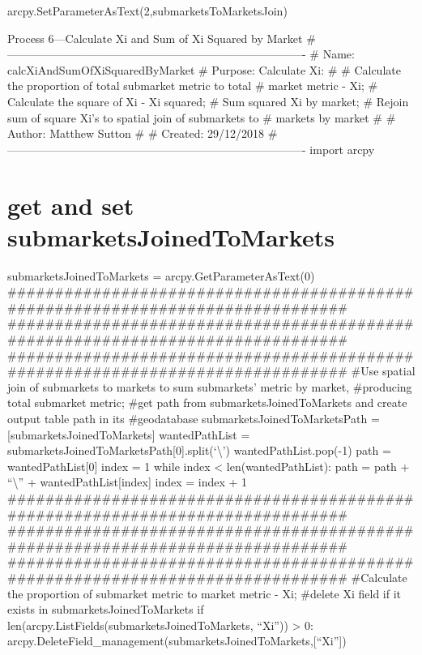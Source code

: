 \documentclass[]{article}
\begin{document}
arcpy.SetParameterAsText(2,submarketsToMarketsJoin)

Process 6---Calculate Xi and Sum of Xi Squared by Market
\#-------------------------------------------------------------------------------
\# Name: calcXiAndSumOfXiSquaredByMarket \# Purpose: Calculate Xi: \# \#
Calculate the proportion of total submarket metric to total \# market
metric - Xi; \# Calculate the square of Xi - Xi squared; \# Sum squared
Xi by market; \# Rejoin sum of square Xi's to spatial join of submarkets
to \# markets by market \# \# Author: Matthew Sutton \# \# Created:
29/12/2018
\#-------------------------------------------------------------------------------
import arcpy

\section{get and set
submarketsJoinedToMarkets}\label{get-and-set-submarketsjoinedtomarkets}

submarketsJoinedToMarkets = arcpy.GetParameterAsText(0)
\#\#\#\#\#\#\#\#\#\#\#\#\#\#\#\#\#\#\#\#\#\#\#\#\#\#\#\#\#\#\#\#\#\#\#\#\#\#\#\#\#\#\#\#\#\#\#\#\#\#\#\#\#\#\#\#\#\#\#\#\#\#\#\#\#\#\#\#\#\#\#\#\#\#\#\#\#\#\#
\#\#\#\#\#\#\#\#\#\#\#\#\#\#\#\#\#\#\#\#\#\#\#\#\#\#\#\#\#\#\#\#\#\#\#\#\#\#\#\#\#\#\#\#\#\#\#\#\#\#\#\#\#\#\#\#\#\#\#\#\#\#\#\#\#\#\#\#\#\#\#\#\#\#\#\#\#\#\#
\#\#\#\#\#\#\#\#\#\#\#\#\#\#\#\#\#\#\#\#\#\#\#\#\#\#\#\#\#\#\#\#\#\#\#\#\#\#\#\#\#\#\#\#\#\#\#\#\#\#\#\#\#\#\#\#\#\#\#\#\#\#\#\#\#\#\#\#\#\#\#\#\#\#\#\#\#\#\#
\#Use spatial join of submarkets to markets to sum submarkets' metric by
market, \#producing total submarket metric; \#get path from
submarketsJoinedToMarkets and create output table path in its
\#geodatabase submarketsJoinedToMarketsPath =
{[}submarketsJoinedToMarkets{]} wantedPathList =
submarketsJoinedToMarketsPath{[}0{]}.split(`\textbackslash{}')
wantedPathList.pop(-1) path = wantedPathList{[}0{]} index = 1 while
index \textless{} len(wantedPathList): path = path +
``\textbackslash{}'' + wantedPathList{[}index{]} index = index + 1
\#\#\#\#\#\#\#\#\#\#\#\#\#\#\#\#\#\#\#\#\#\#\#\#\#\#\#\#\#\#\#\#\#\#\#\#\#\#\#\#\#\#\#\#\#\#\#\#\#\#\#\#\#\#\#\#\#\#\#\#\#\#\#\#\#\#\#\#\#\#\#\#\#\#\#\#\#\#\#
\#\#\#\#\#\#\#\#\#\#\#\#\#\#\#\#\#\#\#\#\#\#\#\#\#\#\#\#\#\#\#\#\#\#\#\#\#\#\#\#\#\#\#\#\#\#\#\#\#\#\#\#\#\#\#\#\#\#\#\#\#\#\#\#\#\#\#\#\#\#\#\#\#\#\#\#\#\#\#
\#\#\#\#\#\#\#\#\#\#\#\#\#\#\#\#\#\#\#\#\#\#\#\#\#\#\#\#\#\#\#\#\#\#\#\#\#\#\#\#\#\#\#\#\#\#\#\#\#\#\#\#\#\#\#\#\#\#\#\#\#\#\#\#\#\#\#\#\#\#\#\#\#\#\#\#\#\#\#
\#Calculate the proportion of submarket metric to market metric - Xi;
\#delete Xi field if it exists in submarketsJoinedToMarkets if
len(arcpy.ListFields(submarketsJoinedToMarkets, ``Xi'')) \textgreater{}
0: arcpy.DeleteField\_management(submarketsJoinedToMarkets,{[}``Xi''{]})
\end{document}
